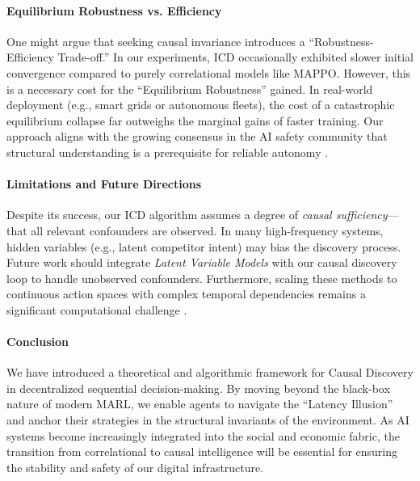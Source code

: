 \paragraph{Equilibrium Robustness vs. Efficiency}
One might argue that seeking causal invariance introduces a ``Robustness-Efficiency Trade-off.'' In our experiments, ICD occasionally exhibited slower initial convergence compared to purely correlational models like MAPPO. However, this is a necessary cost for the ``Equilibrium Robustness'' gained. In real-world deployment (e.g., smart grids or autonomous fleets), the cost of a catastrophic equilibrium collapse far outweighs the marginal gains of faster training. Our approach aligns with the growing consensus in the AI safety community that structural understanding is a prerequisite for reliable autonomy \cite{scholkopf2021causality, ref_new_researchgatenet}.

\paragraph{Limitations and Future Directions}
Despite its success, our ICD algorithm assumes a degree of \textit{causal sufficiency}—that all relevant confounders are observed. In many high-frequency systems, hidden variables (e.g., latent competitor intent) may bias the discovery process. Future work should integrate \textit{Latent Variable Models} with our causal discovery loop to handle unobserved confounders. Furthermore, scaling these methods to continuous action spaces with complex temporal dependencies remains a significant computational challenge \cite{ref_new_opticaorg, ref_new_amazonawscom}.

\paragraph{Conclusion}
We have introduced a theoretical and algorithmic framework for Causal Discovery in decentralized sequential decision-making. By moving beyond the black-box nature of modern MARL, we enable agents to navigate the ``Latency Illusion'' and anchor their strategies in the structural invariants of the environment. As AI systems become increasingly integrated into the social and economic fabric, the transition from correlational to causal intelligence will be essential for ensuring the stability and safety of our digital infrastructure.